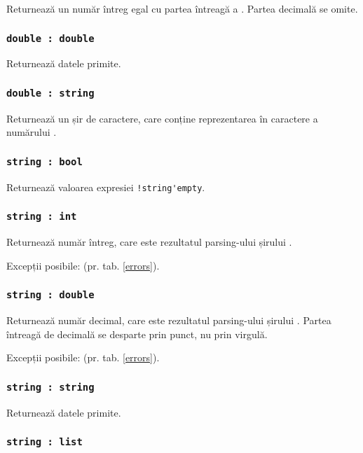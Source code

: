 Returnează un număr întreg egal cu partea întreagă a \double. Partea decimală se omite.

\subsubsection{\lstinline|double : double|}

Returnează datele primite.

\subsubsection{\lstinline|double : string|}

Returnează un șir de caractere, care conține reprezentarea în caractere a numărului \double.

\subsubsection{\lstinline|string : bool|}

Returnează valoarea expresiei \lstinline|!string'empty|.

\subsubsection{\lstinline|string : int|}

Returnează număr întreg, care este rezultatul parsing-ului șirului \str.

Excepții posibile:  (pr. tab. \ref{errors}).

\subsubsection{\lstinline|string : double|}

Returnează număr decimal, care este rezultatul parsing-ului șirului \str. Partea întreagă de decimală se desparte prin punct, nu prin virgulă.

Excepții posibile:  (pr. tab. \ref{errors}).

\subsubsection{\lstinline|string : string|}

Returnează datele primite.

\subsubsection{\lstinline|string : list|}


